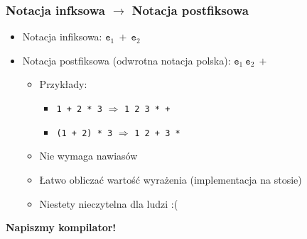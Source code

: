 \documentclass{beamer}
\begin{document}
	\begin{frame}
		\frametitle{Notacja infksowa $\rightarrow$ Notacja postfiksowa}
		\begin{itemize}
			\item Notacja infiksowa: $\texttt{e}_1\ +\ \texttt{e}_2$
			\item Notacja postfiksowa (odwrotna notacja polska): $\texttt{e}_1\ \texttt{e}_2\ +$
			\begin{itemize}
				\item Przykłady:
				\begin{itemize}
					\item \texttt{1 + 2 * 3}\hspace{1em} $\Rightarrow$ \hspace{1em}\texttt{1 2 3 * +}
					\item \texttt{(1 + 2) * 3}\hspace{1em} $\Rightarrow$ \hspace{1em}\texttt{1 2 + 3 * }
				\end{itemize}
				\item Nie wymaga nawiasów
				\item Łatwo obliczać wartość wyrażenia (implementacja na stosie)
				\item Niestety nieczytelna dla ludzi :( 
			\end{itemize}
		\end{itemize}
	\textbf{Napiszmy kompilator!}\newline
	\end{frame}
	
\end{document}
